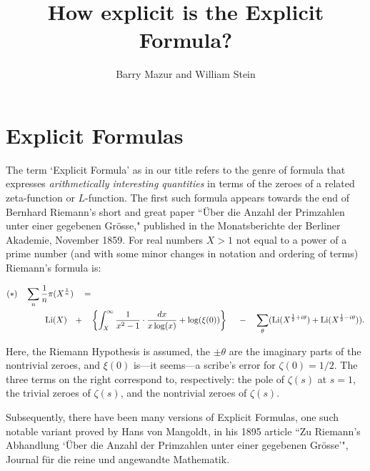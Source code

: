\documentclass[11pt]{article}
\title{How explicit is the Explicit Formula?}
\author{Barry Mazur and William Stein}
\theoremstyle{plain}
\theoremstyle{definition}
\numberwithin{equation}{section}
\numberwithin{figure}{section}
\numberwithin{table}{section}
\begin{document}
\maketitle


\vskip10pt
\tableofcontents
\section{Explicit Formulas}
\vskip10pt

The  term `Explicit Formula' as in our title refers to the genre of formula that expresses {\it arithmetically interesting quantities} in terms of the zeroes of  a related zeta-function or $L$-function.  The first such formula appears towards the end of Bernhard Riemann's short and great paper  ``\"{U}ber die Anzahl der Primzahlen unter einer
gegebenen Gr\"{o}sse," published in the
Monatsberichte der Berliner Akademie,
November 1859.  For real numbers $X>1$ not equal to a power of a prime number  (and with some minor changes in notation and ordering  of terms) Riemann's formula is:


\begin{align*}
{\bf (*)}\ \ \ \sum_{n} {\frac{1}{n}}\pi(X^{{\frac{1}{n}}}) \ \ \ &= \\
  {\rm Li}(X) \ \ \  +& \ \ \  \left\{ \int_X^{\infty}{\frac{1}{x^2-1}}\cdot {\frac{dx}{x\log(x)}} +\log(\xi(0))\right\}\ \ \ \     - \ \ \   \sum_\theta({\rm Li}(X^{{\frac{1}{2}}+i\theta})+ {\rm Li}(X^{{\frac{1}{2}}-i\theta})).
\end{align*}


Here,  the Riemann Hypothesis is assumed,
 the $\pm \theta$ are the imaginary parts of the nontrivial zeroes, and  $\xi(0)$ is---it seems---a scribe's error for  $\zeta(0)=1/2$.%
The three terms on the right correspond to, respectively:  the pole of $\zeta(s)$ at $s=1$, the trivial zeroes of $\zeta(s)$, and the nontrivial zeroes of $\zeta(s)$.


 Subsequently, there have been many versions of Explicit Formulas, one such notable variant  proved by Hans von  Mangoldt, in his 1895 article  ``Zu Riemann's Abhandlung `\"{U}ber die Anzahl der Primzahlen unter einer gegebenen Gr\"{o}sse'", Journal f\"{u}r die reine und angewandte Mathematik.
\end{document}
